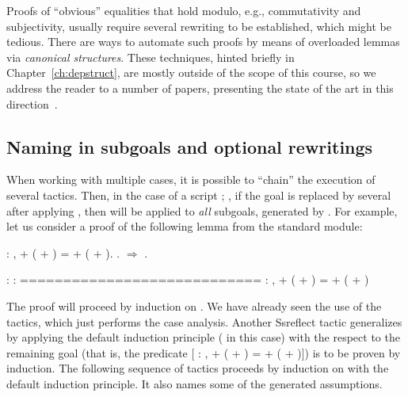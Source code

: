 Proofs of ``obvious'' equalities that hold modulo, e.g., commutativity
and subjectivity, usually require several rewriting to be established,
which might be tedious.  There are ways to automate such proofs by
means of overloaded lemmas via \textit{canonical structures}. These
techniques, hinted briefly in Chapter~\ref{ch:depstruct}, are mostly
outside of the scope of this course, so we address the reader to a
number of papers, presenting the state of the art in this
direction~\cite{Gontier-al:ICFP11,Mahboubi-Tassi:ITP13}.


\subsection{Naming in subgoals and optional rewritings}


\label{sec:naming-subgoals}


When working with multiple cases, it is possible to ``chain'' the
execution of several tactics. Then, in the case of a script ;
, if the goal is replaced by several after applying , then
 will be applied to \textit{all} subgoals, generated by . For
example, let us consider a proof of the following lemma from the
standard   module:


\begin{coqdoccode}
\coqdocemptyline
\coqdocnoindent
{} : \coqdockw{\ensuremath{\forall}}   ,  + ( + ) =  + ( + ).\coqdoceol
\coqdocnoindent
{}.\coqdoceol
\coqdocnoindent
{}\ensuremath{\Rightarrow} .\coqdoceol
\coqdocemptyline
\end{coqdoccode}


\coqdoceol
\coqdocemptyline
\coqdocindent{1.00em}
 : \coqdoceol
\coqdocindent{1.00em}
 : \coqdoceol
\coqdocindent{1.00em}
============================\coqdoceol
\coqdocindent{1.50em}
\coqdockw{\ensuremath{\forall}}  : ,  + ( + ) =  + ( + )

\coqdocemptyline


The proof will proceed by induction on . We have already seen the
use of the  tactics, which just performs the case
analysis. Another Ssreflect tactic   generalizes
 by applying the default induction principle ( in this
case) with the respect to the remaining goal (that is, the predicate
[\coqdockw{\ensuremath{\forall}}  : ,  + ( + ) =  + ( + )]) is to be proven by
induction.  The following sequence of tactics proceeds by induction on
 with the default induction principle. It also names some of the
generated assumptions. 


